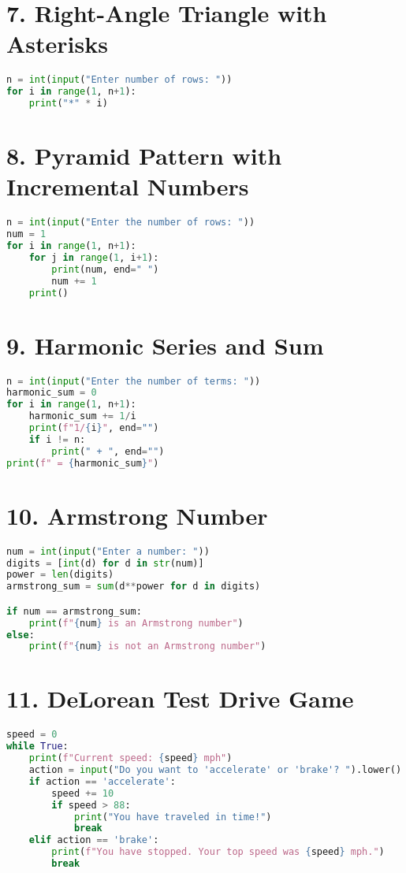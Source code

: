 \documentclass{article}
\begin{document}
\section*{7. Right-Angle Triangle with Asterisks}
\begin{lstlisting}[language=Python]
n = int(input("Enter number of rows: "))
for i in range(1, n+1):
    print("*" * i)
\end{lstlisting}

\section*{8. Pyramid Pattern with Incremental Numbers}
\begin{lstlisting}[language=Python]
n = int(input("Enter the number of rows: "))
num = 1
for i in range(1, n+1):
    for j in range(1, i+1):
        print(num, end=" ")
        num += 1
    print()
\end{lstlisting}

\section*{9. Harmonic Series and Sum}
\begin{lstlisting}[language=Python]
n = int(input("Enter the number of terms: "))
harmonic_sum = 0
for i in range(1, n+1):
    harmonic_sum += 1/i
    print(f"1/{i}", end="")
    if i != n:
        print(" + ", end="")
print(f" = {harmonic_sum}")
\end{lstlisting}

\section*{10. Armstrong Number}
\begin{lstlisting}[language=Python]
num = int(input("Enter a number: "))
digits = [int(d) for d in str(num)]
power = len(digits)
armstrong_sum = sum(d**power for d in digits)

if num == armstrong_sum:
    print(f"{num} is an Armstrong number")
else:
    print(f"{num} is not an Armstrong number")
\end{lstlisting}

\section*{11. DeLorean Test Drive Game}
\begin{lstlisting}[language=Python]
speed = 0
while True:
    print(f"Current speed: {speed} mph")
    action = input("Do you want to 'accelerate' or 'brake'? ").lower()
    if action == 'accelerate':
        speed += 10
        if speed > 88:
            print("You have traveled in time!")
            break
    elif action == 'brake':
        print(f"You have stopped. Your top speed was {speed} mph.")
        break
\end{lstlisting}
\end{document}
